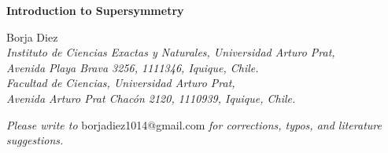 \documentclass[11pt,letterpaper]{article}
\def\author{Borja Diez}
\def\title{Introduction to Supersymmetry}
\begin{document}
{\centering
 \vspace*{1cm}
\textbf{\LARGE{\title{}}}
\vspace{0.5cm}
\begin{center}
\author{}\\
\vspace{0.5cm}
\textit{Instituto de Ciencias Exactas y Naturales, Universidad Arturo Prat,\\
Avenida Playa Brava 3256, 1111346, Iquique, Chile.\\
Facultad de Ciencias, Universidad Arturo Prat,\\
Avenida Arturo Prat Chac\'on 2120, 1110939, Iquique, Chile.}
\end{center}
\vspace{1cm}
\begin{abstract}
\vspace{0.5cm}
\end{abstract}}

\vspace{5cm}

\begin{center}
\textit{Please write to} borjadiez1014@gmail.com \textit{for corrections, typos, and literature suggestions.}
\end{center}


\thispagestyle{empty}

\newpage
\tableofcontents
\thispagestyle{empty}
\newpage
\clearpage
{} 



%











\newpage


\end{document}
